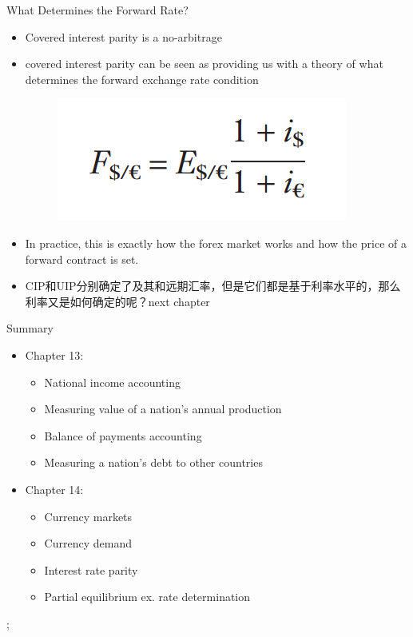 \documentclass[10pt,hyperref={CJKbookmarks=true},xcolor=dvipsnames,aspectratio=169]{beamer}
\begin{document}
\begin{frame}{What Determines the Forward Rate?}
\begin{itemize}
	\item Covered interest parity is a no-arbitrage
		\item covered interest parity can be seen as providing us with a theory 	of what determines the forward exchange rate
	condition 
	\begin{figure}
\centering
\includegraphics[scale=0.4]{fig/uip/cip3.png}		
	\end{figure}	
\item In practice, this is exactly how the forex market works and how the price of a forward contract is set.
\item CIP和UIP分别确定了及其和远期汇率，但是它们都是基于利率水平的，那么利率又是如何确定的呢？next chapter
\end{itemize}
\end{frame}


\begin{frame}{Summary}
\begin{itemize}
\item Chapter 13:
\begin{itemize}
\item National income accounting
\item Measuring value of a nation's annual production
\item Balance of payments accounting
\item Measuring a nation's debt to other countries
\end{itemize}
\item Chapter 14:
\begin{itemize}
\item Currency markets
\item Currency demand
\item Interest rate parity
\item Partial equilibrium ex. rate determination
\end{itemize}
\end{itemize};
\end{frame}
\end{document}
